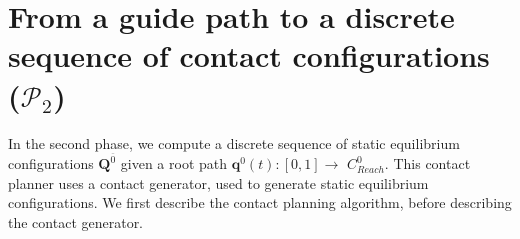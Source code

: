 \documentclass[journal]{IEEEtran}
\newcommand{\gls}[1]{\textit{#1}}
\begin{document}
\section{From a guide path to a discrete sequence of contact configurations ($\mathcal{P}_2$)}
\label{sec:contact}
In the second phase, we compute a discrete sequence of static equilibrium configurations $\mathbf{Q}^{\overline{0}}$ given a root path
$\mathbf{q}^0(t) : [0,1] \longrightarrow$ \gls{$C_{Reach}^0$}. This contact planner uses a contact generator, used to generate static equilibrium configurations. We first describe the contact planning algorithm, before describing
the contact generator.



\end{document}
